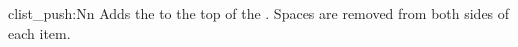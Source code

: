  \begin{docCommand}{clist_push:Nn}{  }
   Adds the  to the top of the .
   Spaces are removed from both sides of each item.
 \end{docCommand}
%
%

